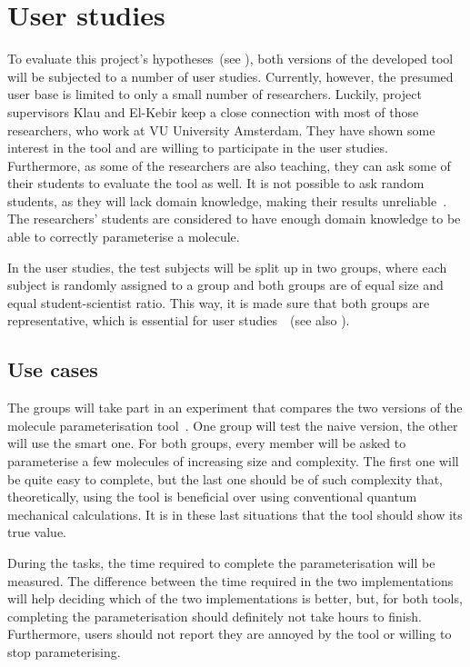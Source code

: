 \section{User studies}
To evaluate this project's hypotheses~(see ), both versions of the developed tool will be subjected to a number of user studies. Currently, however, the presumed user base is limited to only a small number of researchers. Luckily, project supervisors Klau and El-Kebir keep a close connection with most of those researchers, who work at VU University Amsterdam. They have shown some interest in the tool and are willing to participate in the user studies. Furthermore, as some of the researchers are also teaching, they can ask some of their students to evaluate the tool as well. It is not possible to ask random students, as they will lack domain knowledge, making their results unreliable~\cite{jonassen2000toward}. The researchers' students are considered to have enough domain knowledge to be able to correctly parameterise a molecule.

In the user studies, the test subjects will be split up in two groups, where each subject is randomly assigned to a group and both groups are of equal size and equal student-scientist ratio. This way, it is made sure that both groups are representative, which is essential for user studies~\cite{wohlin2003empirical}~(see also ).

\subsection{Use cases}
The groups will take part in an experiment that compares the two versions of the molecule parameterisation tool~\cite{wohlin2003empirical}. One group will test the naive version, the other will use the smart one. For both groups, every member will be asked to parameterise a few molecules of increasing size and complexity. The first one will be quite easy to complete, but the last one should be of such complexity that, theoretically, using the tool is beneficial over using conventional quantum mechanical calculations. It is in these last situations that the tool should show its true value.

During the tasks, the time required to complete the parameterisation will be measured. The difference between the time required in the two implementations will help deciding which of the two implementations is better, but, for both tools, completing the parameterisation should definitely not take hours to finish. Furthermore, users should not report they are annoyed by the tool or willing to stop parameterising.

